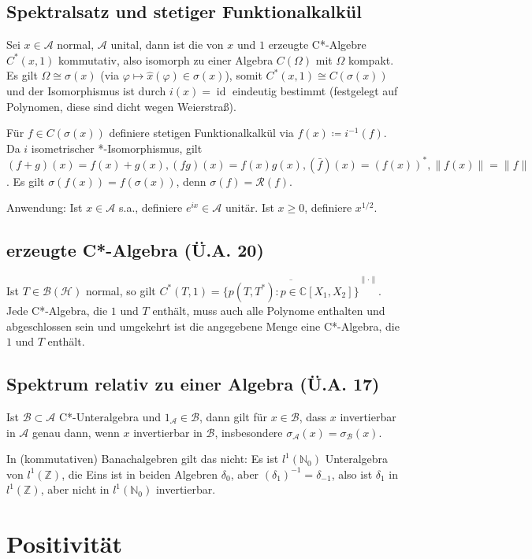 \documentclass[11pt,a4paper]{scrartcl}
\newcommand{\N}{\mathbb{N}} %
\newcommand{\Z}{\mathbb{Z}} %
\newcommand{\C}{\mathbb{C}} %
\newcommand{\Hc}{\mathcal{H}}
\newcommand{\A}{\mathcal{A}}
\newcommand{\B}{\mathcal{B}}
\newcommand{\Rc}{\mathcal{R}}
\theoremstyle{plain}
\theoremstyle{definition}
\theoremstyle{remark}
\DeclareMathOperator{\id}{id}
\begin{document}
\subsection{Spektralsatz und stetiger Funktionalkalkül}

Sei $x\in \A$ normal, $\A$ unital, dann ist die von $x$ und $1$ erzeugte C*-Algebre $C^*(x,1)$ kommutativ, also isomorph zu einer Algebra $C(\Omega)$ mit $\Omega$ kompakt. Es gilt $\Omega \cong \sigma(x)$ (via $\varphi \mapsto \hat x(\varphi) \in \sigma(x)$), somit $C^*(x,1)\cong C(\sigma(x))$ und der Isomorphismus ist durch $i(x)=\id$ eindeutig bestimmt (festgelegt auf Polynomen, diese sind dicht wegen Weierstraß).

Für $f\in C(\sigma(x))$ definiere stetigen Funktionalkalkül via $f(x) \coloneqq i^{-1}(f)$. Da $i$ isometrischer *-Isomorphismus, gilt $(f+g)(x)=f(x)+g(x), (fg)(x)=f(x)g(x), (\bar f)(x)=(f(x))^*, \|f(x)\|=\|f\|$. Es gilt $\sigma(f(x))=f(\sigma(x))$, denn $\sigma(f)=\Rc(f)$.

Anwendung: Ist $x\in \A$ s.a., definiere $e^{ix}\in \A$ unitär. Ist $x \geq 0$, definiere $x^{1/2}$.

\subsection{erzeugte C*-Algebra (Ü.A. 20)}

Ist $T\in \B(\Hc)$ normal, so gilt $C^*(T,1)=\overline{\{p(T,T^*): p\in \C[X_1,X_2]\}}^{\|\cdot\|}$. Jede C*-Algebra, die $1$ und $T$ enthält, muss auch alle Polynome enthalten und abgeschlossen sein und umgekehrt ist die angegebene Menge eine C*-Algebra, die $1$ und $T$ enthält.

\subsection{Spektrum relativ zu einer Algebra (Ü.A. 17)}

Ist $\B \subset \A$ C*-Unteralgebra und $1_\mathcal{A} \in \B$, dann gilt für $x\in \B$, dass $x$ invertierbar in $\A$ genau dann, wenn $x$ invertierbar in $\B$, insbesondere $\sigma_\A(x)=\sigma_\B(x)$.

In (kommutativen) Banachalgebren gilt das nicht: Es ist $l^1(\N_0)$ Unteralgebra von $l^1(\Z)$, die Eins ist in beiden Algebren $\delta_0$, aber $(\delta_1)^{-1}=\delta_{-1}$, also ist $\delta_1$ in $l^1(\Z)$, aber nicht in $l^1(\N_0)$ invertierbar.

\section{Positivität}
\end{document}
